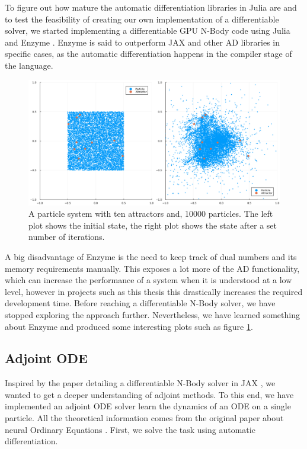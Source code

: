 \documentclass{article}
\begin{document}
{\begin{appendices}
To figure out how mature the automatic differentiation libraries in Julia are and to test the feasibility of creating our own implementation of a differentiable solver, we started implementing a differentiable GPU N-Body code using Julia and Enzyme \citep{enzyme1, enzyme2, enzyme3}. Enzyme is said to outperform {JAX} and other AD libraries in specific cases, as the automatic differentiation happens in the compiler stage of the language.

\begin{figure}[h]
    \centering
    \includegraphics[width=0.9\linewidth]{img/particles.png}
    \caption{A particle system with ten attractors and, 10000 particles. The left plot shows the initial state, the right plot shows the state after a set number of iterations.}
    \label{fig:enzyme}
\end{figure}

A big disadvantage of Enzyme is the need to keep track of dual numbers and its memory requirements manually. This exposes a lot more of the AD functionality, which can increase the performance of a system when it is understood at a low level, however in projects such as this thesis this drastically increases the required development time. Before reaching a differentiable N-Body solver, we have stopped exploring the approach further. Nevertheless, we have learned something about Enzyme and produced some interesting plots such as figure \ref{fig:enzyme}.

\subsection{Adjoint ODE}
\label{adj-ode}

Inspired by the paper detailing a differentiable N-Body solver in {JAX} \citep{li2024differentiable}, we wanted to get a deeper understanding of adjoint methods. To this end, we have implemented an adjoint ODE solver learn the dynamics of an ODE on a single particle. All the theoretical information comes from the original paper about neural Ordinary Equations \cite{chen2018neural}. First, we solve the task using automatic differentiation.


\end{appendices}}
\end{document}
